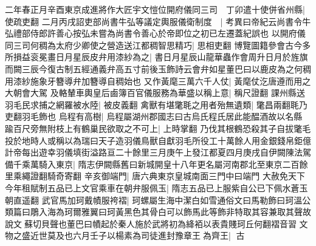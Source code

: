二年春正月辛酉東京成進將作大匠宇文愷位開府儀同三司　丁卯遣十使併省州縣|{
	使疏吏翻}
二月丙戌詔吏部尚書牛弘等議定輿服儀衛制度　|{
	考異曰帝紀云尚書令牛弘禮部侍郎許善心按弘未嘗為尚書令善心於帝即位之初已左遷蓋紀誤也}
以開府儀同三司何稠為太府少卿使之營造送江都稠智思精巧|{
	思相吏翻}
博覽圖籍參會古今多所損益衮冕畫日月星辰皮弁用漆紗為之|{
	書日月星辰山龍華蟲作會周升日月於旌旗而闕三辰今復古制五經通義弁高五寸前後玉飾詩云會弁如星董巴曰以鹿皮為之何稠用漆紗施象牙簪導弁加簪導自稠始也}
又作黃麾三萬六千人仗|{
	黃麾仗汔唐遵而用之大朝會大駕}
及輅輦車輿皇后鹵簿百官儀服務為華盛以稱上意|{
	稱尺證翻}
課州縣送羽毛民求捕之網羅被水陸|{
	被皮義翻}
禽獸有堪氅毦之用者殆無遺類|{
	氅昌兩翻毦乃吏翻羽毛飾也}
烏程有高樹|{
	烏程屬湖州郡國志曰古烏氏程氏居此能醖酒故以名縣}
踰百尺旁無附枝上有鶴巢民欲取之不可上|{
	上時掌翻}
乃伐其根鶴恐殺其子自拔氅毛投於地時人或稱以為瑞曰天子造羽儀鳥獸自獻羽毛所役工十萬餘人用金銀錢帛鉅億計帝每出遊幸羽儀填街溢路亘二十餘里三月庚午上發江都夏四月庚戌自伊闕陳法駕備千乘萬騎入東京|{
	隋志伊闕縣舊曰新城開皇十八年更名屬河南郡北至東京二百餘里乘繩證翻騎奇寄翻}
辛亥御端門|{
	唐六典東京皇城南面三門中曰端門}
大赦免天下今年租賦制五品已上文官乘車在朝弁服佩玉|{
	隋志五品已上服紫自公已下佩水蒼玉朝直遥翻}
武官馬加珂戴幘服袴褶|{
	珂螺屬生海中潔白如雪通俗文曰馬勒飾曰珂溫公類篇曰鵰入海為珂爾雅翼曰珂黃黑色其骨白可以飾馬此等飾非特取其容兼取其聲故說文蘇切貝聲也董巴曰幘起於秦人施於武將初為絳袹以表貴賤珂丘何翻褶音習}
文物之盛近世莫及也六月壬子以楊素為司徒進封豫章王為齊王|{
	古}


